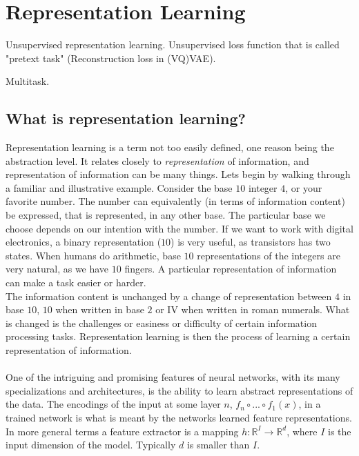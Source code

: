 \documentclass[../../thesis.tex]{subfiles}
\begin{document}
\section{Representation Learning}

Unsupervised representation learning. Unsupervised loss function that is called "pretext task" (Reconstruction loss in (VQ)VAE).  

Multitask.
\cite{Rep-rev-persp}

\subsection{What is representation learning?}
Representation learning is a term not too easily defined, one reason being the abstraction level. It relates closely to \textit{representation} of information, and representation of information can be many things. Lets begin by walking through a familiar and illustrative example. Consider the base $10$ integer $4$, or your favorite number. The number can equivalently (in terms of information content) be expressed, that is represented, in any other base. The particular base we choose depends on our intention with the number. If we want to work with digital electronics, a binary representation ($10$) is very useful, as transistors has two states. When humans do arithmetic, base $10$ representations of the integers are very natural, as we have $10$ fingers. A particular representation of information can make a task easier or harder.
\\ The information content is unchanged by a change of representation between $4$ in base $10$, $10$ when written in base $2$ or \RN{4} when written in roman numerals. What is changed is the challenges or easiness or difficulty of certain information processing tasks. Representation learning is then the process of learning a certain representation of information. \\\\

One of the intriguing and promising features of neural networks, with its many specializations and architectures, is the ability to learn abstract representations of the data. 
The encodings of the input at some layer $n$, $f_n\circ ...\circ f_1(x)$, in a trained network is what is meant by the networks learned feature representations. In more general terms a feature extractor is a mapping $h:\mathbb{R}^I \to \mathbb{R}^d$, where $I$ is the input dimension of the model. Typically $d$ is smaller than $I$.
\end{document}
